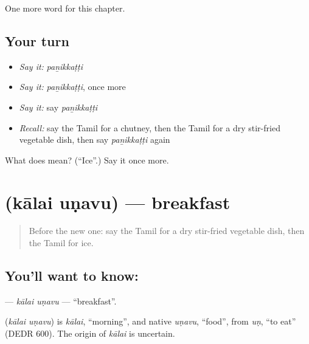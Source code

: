 \begin{grammarlens}[title={What you've built}]
One more word for this chapter.
\end{grammarlens}

\subsection*{Your turn}
\begin{itemize}
\raggedright
  \item \emph{Say it:} \emph{paṉikkaṭṭi}
  \item \emph{Say it:} \emph{paṉikkaṭṭi}, once more
  \item \emph{Say it:} say \emph{paṉikkaṭṭi}
  \item \emph{Recall:} say the Tamil for a chutney, then the Tamil for a dry stir-fried vegetable dish, then say \emph{paṉikkaṭṭi} again
\end{itemize}

\begin{tcolorbox}[breakable,colback=teal!4,colframe=teal!35!black,title={Before you move on}]
What does  mean? (\textquotedblleft{}Ice\textquotedblright{}.) Say it once more.
\end{tcolorbox}
\section[\texorpdfstring{\ta{காலை} \ta{உணவு} (kālai uṇavu)}{காலை உணவு (kālai uṇavu)}]{  (kālai uṇavu) — breakfast}

\label{lesson:TA-C184-kalai-unavu}



\begin{quote}
Before the new one: say the Tamil for a dry stir-fried vegetable dish, then the Tamil for ice.
\end{quote}

\subsection*{You'll want to know:  }
\textbf{ } — \emph{kālai uṇavu} — \textquotedblleft{}breakfast\textquotedblright{}.

\begin{cousinweb}
\textbf{ } (\emph{kālai uṇavu}) is \emph{kālai}, \textquotedblleft{}morning\textquotedblright{}, and native \emph{uṇavu}, \textquotedblleft{}food\textquotedblright{}, from \emph{uṇ}, \textquotedblleft{}to eat\textquotedblright{} (DEDR 600). The origin of \emph{kālai} is uncertain.
\end{cousinweb}

